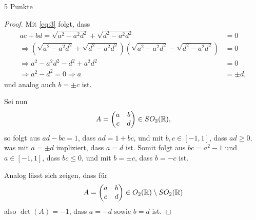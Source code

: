 \documentclass{problemset}
\begin{document}
\begin{problem}{5 Punkte}
\begin{proof}
    Mit \eqref{eq:3} folgt, dass
    \begin{align*}
        ac + bd = \sqrt{a^2 - a^2 d^2} + \sqrt{d^2 - a^2 d^2}                                                                         & = 0      \\
        \Rightarrow \left(\sqrt{a^2 - a^2 d^2} + \sqrt{d^2 - a^2 d^2}\right) \left(\sqrt{a^2 - a^2 d^2} - \sqrt{d^2 - a^2 d^2}\right) & = 0      \\
        \Rightarrow a^2 - a^2 d^2 - d^2 + a^2 d^2                                                                                     & = 0      \\
        \Rightarrow a^2 - d^2 = 0 \Rightarrow a                                                                                       & = \pm d,
    \end{align*}
    und analog auch \(b = \pm c\) ist.

    Sei nun
    \[
        A = \begin{pmatrix}
            a & b \\
            c & d
        \end{pmatrix} \in SO_2(\mathbb{R}),
    \]
    so folgt aus \(ad - bc = 1\), dass \(ad = 1 + bc\), und mit \(b, c \in [-1,
    1]\), dass \(ad \geq 0\), was mit \(a = \pm d\) impliziert, dass \(a = d\)
    ist. Somit folgt aus \(bc = a^2 - 1\) und \(a \in [-1, 1]\), dass \(bc \leq
    0\), und mit \(b = \pm c\), dass \(b = -c\) ist.

    Analog lässt sich zeigen, dass für
    \[
        A = \begin{pmatrix}
            a & b \\
            c & d
        \end{pmatrix} \in O_2(\mathbb{R}) \setminus SO_2(\mathbb{R})
    \]
    also \(\det(A) = -1\), dass \(a = -d\) sowie \(b = d\) ist.
\end{proof}

\end{problem}
\end{document}
